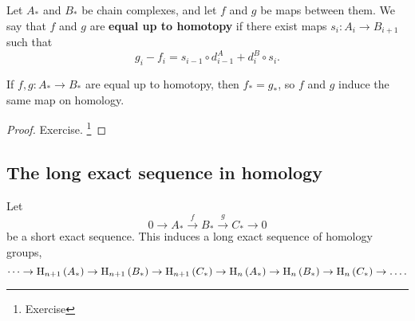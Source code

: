 Let $ A_* $ and $ B_* $ be chain complexes, and let $ f $ and $ g $ be maps between them. We say that $ f $ and $ g $ are \textbf{equal up to homotopy} if there exist maps $ s_i : A_i \to B_{i + 1} $ such that
$$ g_i - f_i = s_{i - 1} \circ d_{i - 1}^A + d_i^B \circ s_i. $$

\begin{proposition}
If $ f, g : A_* \to B_* $ are equal up to homotopy, then $ f_* = g_* $, so $ f $ and $ g $ induce the same map on homology.
\end{proposition}

\begin{proof}
Exercise. \footnote{Exercise}
\end{proof}

\subsection{The long exact sequence in homology}

\begin{proposition}
\label{prop:homologysequence}
Let
$$ 0 \to A_* \xrightarrow{f} B_* \xrightarrow{g} C_* \to 0 $$
be a short exact sequence. This induces a long exact sequence of homology groups,
$$ \dots \to \H_{n + 1}\br{A_*} \to \H_{n + 1}\br{B_*} \to \H_{n + 1}\br{C_*} \to \H_n\br{A_*} \to \H_n\br{B_*} \to \H_n\br{C_*} \to \dots. $$
\end{proposition}


